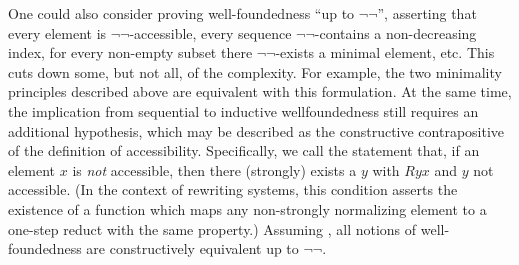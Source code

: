 One could also consider proving well-foundedness ``up to $\lnot\lnot$'',
asserting that every element is $\lnot\lnot$-accessible,
every sequence $\lnot\lnot$-contains a non-decreasing index,
for every non-empty subset there $\lnot\lnot$-exists a minimal element, etc.
This cuts down some, but not all, of the complexity.
For example, the two minimality principles
described above are equivalent with this formulation.
At the same time, the
implication from sequential to inductive wellfoundedness
still requires an additional hypothesis, which may be described as the
constructive contrapositive of the definition of accessibility.
Specifically, we call {\accCor} the statement that, if an element $x$
is \emph{not} accessible, then there (strongly) exists a $y$ with $Ryx$
and $y$ not accessible.  (In the context of rewriting systems,
this condition asserts the existence of a function which maps any
non-strongly normalizing element to a one-step reduct with the same property.)
Assuming \accCor, all notions of well-foundedness
are constructively equivalent up to $\lnot\lnot$.


